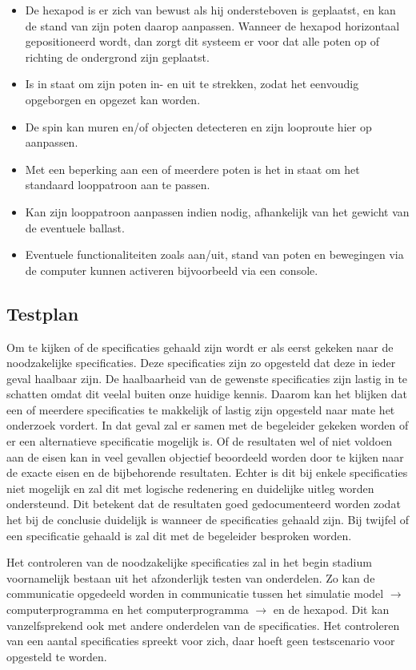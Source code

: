 \documentclass[10pt,a4paper]{article}
\begin{document}
\begin{itemize}
\setlength\itemsep{0em}
\item De hexapod is er zich van bewust als hij ondersteboven is geplaatst, en kan de stand van zijn poten daarop aanpassen. Wanneer de hexapod horizontaal gepositioneerd wordt, dan zorgt dit systeem er voor dat alle poten op of richting de ondergrond zijn geplaatst.
\item Is in staat om zijn poten in- en uit te strekken, zodat het eenvoudig opgeborgen en opgezet kan worden.
\item De spin kan muren en/of objecten detecteren en zijn looproute hier op aanpassen. 
\item Met een beperking aan een of meerdere poten is het in staat om het standaard looppatroon aan te passen.
\item Kan zijn looppatroon aanpassen indien nodig, afhankelijk van het gewicht van de eventuele ballast.
\item Eventuele functionaliteiten zoals aan/uit, stand van poten en bewegingen via de computer kunnen activeren bijvoorbeeld via een console.
\end{itemize}

\subsection{Testplan}
Om te kijken of de specificaties gehaald zijn wordt er als eerst gekeken naar de noodzakelijke specificaties. Deze specificaties zijn zo opgesteld dat deze in ieder geval haalbaar zijn. De haalbaarheid van de gewenste specificaties zijn lastig in te schatten omdat dit veelal buiten onze huidige kennis. Daarom kan het blijken dat een of meerdere specificaties te makkelijk of lastig zijn opgesteld naar mate het onderzoek vordert. In dat geval zal er samen met de begeleider gekeken worden of er een alternatieve specificatie mogelijk is.
Of de resultaten wel of niet voldoen aan de eisen kan in veel gevallen objectief beoordeeld worden door te kijken naar de exacte eisen en de bijbehorende resultaten. Echter is dit bij enkele specificaties niet mogelijk en zal dit met logische redenering en duidelijke uitleg worden ondersteund.
Dit betekent dat de resultaten goed gedocumenteerd worden zodat het bij de conclusie duidelijk is wanneer de specificaties gehaald zijn. Bij twijfel of een specificatie gehaald is zal dit met de begeleider besproken worden.

Het controleren van de noodzakelijke specificaties zal in het begin stadium voornamelijk bestaan uit het afzonderlijk testen van onderdelen. Zo kan de communicatie opgedeeld worden in communicatie tussen het simulatie model $\rightarrow$ computerprogramma en het computerprogramma $\rightarrow$ en de hexapod. Dit kan vanzelfsprekend ook met andere onderdelen van de specificaties. Het controleren van een aantal specificaties spreekt voor zich, daar hoeft geen testscenario voor opgesteld te worden.
\end{document}
